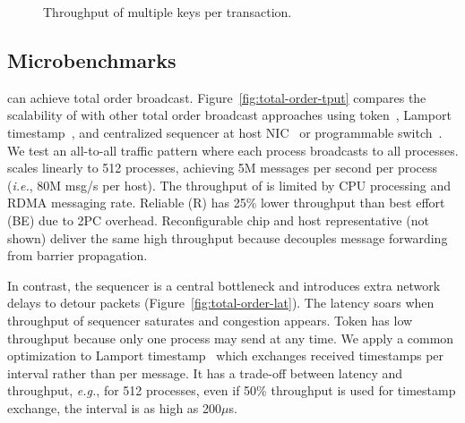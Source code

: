 \begin{figure}[t!]
\begin{minipage}{.31\textwidth}
		\centering
		\caption{Throughput of multiple keys per transaction.}
		\label{fig:multishard}
    \end{minipage}
	\hspace{0.01\textwidth}
\vspace{-15pt}
\end{figure}
\fi

\subsection{Microbenchmarks}

\sys{} can achieve total order broadcast.
Figure~\ref{fig:total-order-tput} compares the scalability of \sys{} with other total order broadcast approaches using token~\cite{rajagopalan1989token}, Lamport timestamp~\cite{lamport1978time}, and centralized sequencer at host NIC~\cite{kaminsky2016design} or programmable switch~\cite{eris}.
We test an all-to-all traffic pattern where each process broadcasts to all processes.
\sys{} scales linearly to 512 processes, achieving 5M messages per second per process (\textit{i.e.}, 80M msg/s per host).
The throughput of \sys is limited by CPU processing and RDMA messaging rate.
Reliable (R) \sys{} has 25\% lower throughput than best effort (BE) \sys{} due to 2PC overhead. %
Reconfigurable chip and host representative (not shown) deliver the same high throughput because \sys{} decouples message forwarding from barrier propagation.


In contrast, the sequencer is a central bottleneck and introduces extra network delays to detour packets (Figure~\ref{fig:total-order-lat}).
The latency soars when throughput of sequencer saturates and congestion appears.
Token has low throughput because only one process may send at any time.
We apply a common optimization to Lamport timestamp~\cite{lamport1978time} which exchanges received timestamps per interval rather than per message.
It has a trade-off between latency and throughput, \textit{e.g.}, for 512 processes, even if 50\% throughput is used for timestamp exchange, the interval is as high as 200$\mu$s.





